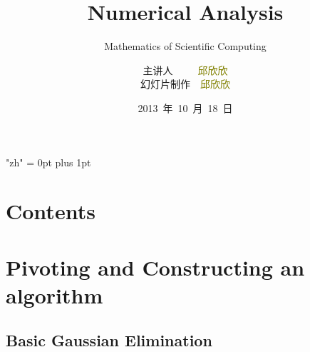 \documentclass[notheorems,mathserif,table,compress]{beamer}  %
\begin{document}
\XeTeXlinebreaklocale "zh"         %
\XeTeXlinebreakskip = 0pt plus 1pt %


\title[Numerical Analysis]{Numerical Analysis}
\subtitle{Mathematics of Scientific Computing}
\author[qiu]{主讲人~~~~~\textcolor{olive}{邱欣欣}\\
    \quad 幻灯片制作~~\textcolor{olive}{邱欣欣}}
\institute[中国海洋大学]{\small\textcolor{violet}{中国海洋大学~~信息科学与工程学院}}
\date{2013~年~10~月~18~日}
\frame{ \titlepage }
\section*{Contents}
\section{Pivoting and Constructing an algorithm}

\subsection{Basic Gaussian Elimination}
\end{document}
